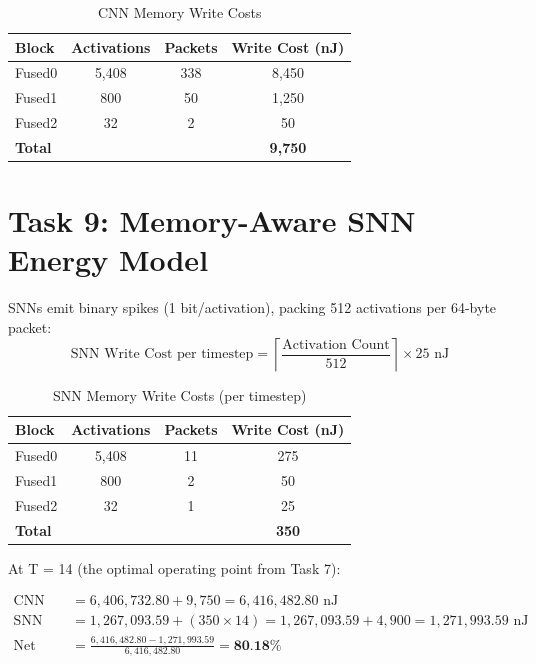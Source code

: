 \documentclass[11pt, a4paper]{article}
\begin{document}
\begin{table}[htbp]
  \centering
  \caption{CNN Memory Write Costs}
  \label{tab:cnn_memory}
  \renewcommand{\arraystretch}{1.2}
  \begin{tabular}{l c c c}
    \toprule
    \textbf{Block} & \textbf{Activations} & \textbf{Packets} & \textbf{Write Cost (nJ)} \\
    \midrule
    Fused0 & 5,408 & 338 & 8,450 \\
    Fused1 & 800 & 50 & 1,250 \\
    Fused2 & 32 & 2 & 50 \\
    \midrule
    \textbf{Total} & & & \textbf{9,750} \\
    \bottomrule
  \end{tabular}
\end{table}

\section{Task 9: Memory-Aware SNN Energy Model}

SNNs emit binary spikes (1 bit/activation), packing 512 activations per 64-byte packet:
\[
\text{SNN Write Cost per timestep} = \left\lceil \frac{\text{Activation Count}}{512} \right\rceil \times 25 \text{ nJ}
\]

\begin{table}[htbp]
  \centering
  \caption{SNN Memory Write Costs (per timestep)}
  \label{tab:snn_memory}
  \renewcommand{\arraystretch}{1.2}
  \begin{tabular}{l c c c}
    \toprule
    \textbf{Block} & \textbf{Activations} & \textbf{Packets} & \textbf{Write Cost (nJ)} \\
    \midrule
    Fused0 & 5,408 & 11 & 275 \\
    Fused1 & 800 & 2 & 50 \\
    Fused2 & 32 & 1 & 25 \\
    \midrule
    \textbf{Total} & & & \textbf{350} \\
    \bottomrule
  \end{tabular}
\end{table}

At T = 14 (the optimal operating point from Task 7):

\begin{align*}
\text{CNN Total Energy} &= 6,406,732.80 + 9,750 = 6,416,482.80 \text{ nJ} \\
\text{SNN Total Energy} &= 1,267,093.59 + (350 \times 14) = 1,267,093.59 + 4,900 = 1,271,993.59 \text{ nJ}\\
\text{Net Savings} &= \frac{6,416,482.80 - 1,271,993.59}{6,416,482.80} = \textbf{80.18\%}
\end{align*}
\end{document}
